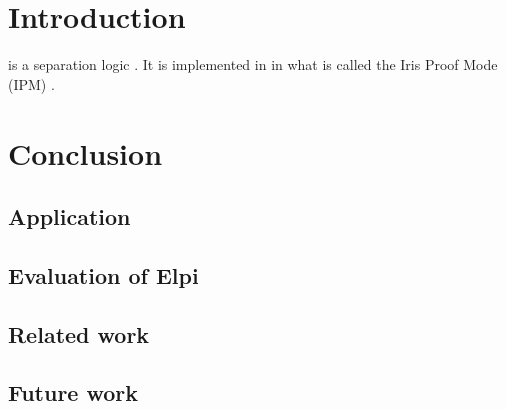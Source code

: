 \documentclass[11pt,a4paper]{report}
\begin{document}


\tableofcontents

\chapter{Introduction}
\label{ch:introduction}

\iris is a separation logic \cite*{jungIrisMonoidsInvariants2015a,jungHigherorderGhostState2016,krebbersEssenceHigherOrderConcurrent2017,jungIrisGroundModular2018}. It is implemented in \coq in what is called the Iris Proof Mode (IPM) \cite*{krebbersInteractiveProofsHigherorder2017,krebbersMoSeLGeneralExtensible2018}.





% 


\chapter{Conclusion}
\section{Application}
\section{Evaluation of Elpi}
\section{Related work}
\section{Future work}


\printbibliography

\newpage
\mbox{}
\thispagestyle{empty}
\newpage
\mbox{}
\thispagestyle{empty}
\end{document}
